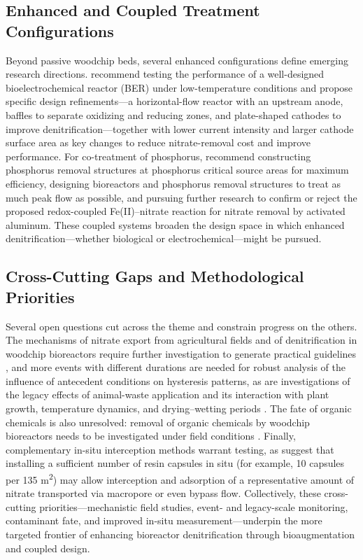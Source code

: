 \subsection{Enhanced and Coupled Treatment Configurations}
Beyond passive woodchip beds, several enhanced configurations define emerging research directions. \textcite{Law2018} recommend testing the performance of a well-designed bioelectrochemical reactor (BER) under low-temperature conditions and propose specific design refinements---a horizontal-flow reactor with an upstream anode, baffles to separate oxidizing and reducing zones, and plate-shaped cathodes to improve denitrification---together with lower current intensity and larger cathode surface area as key changes to reduce nitrate-removal cost and improve performance. For co-treatment of phosphorus, \textcite{Penn2024} recommend constructing phosphorus removal structures at phosphorus critical source areas for maximum efficiency, designing bioreactors and phosphorus removal structures to treat as much peak flow as possible, and pursuing further research to confirm or reject the proposed redox-coupled Fe(II)--nitrate reaction for nitrate removal by activated aluminum. These coupled systems broaden the design space in which enhanced denitrification---whether biological or electrochemical---might be pursued.

\subsection{Cross-Cutting Gaps and Methodological Priorities}
Several open questions cut across the theme and constrain progress on the others. The mechanisms of nitrate export from agricultural fields and of denitrification in woodchip bioreactors require further investigation to generate practical guidelines \parencite{Liu2020}, and more events with different durations are needed for robust analysis of the influence of antecedent conditions on hysteresis patterns, as are investigations of the legacy effects of animal-waste application and its interaction with plant growth, temperature dynamics, and drying--wetting periods \parencite{Liu2020}. The fate of organic chemicals is also unresolved: removal of organic chemicals by woodchip bioreactors needs to be investigated under field conditions \parencite{Ilhan2011}. Finally, complementary in-situ interception methods warrant testing, as \textcite{Pampolino2000} suggest that installing a sufficient number of resin capsules in situ (for example, 10 capsules per 135 m\textsuperscript{2}) may allow interception and adsorption of a representative amount of nitrate transported via macropore or even bypass flow. Collectively, these cross-cutting priorities---mechanistic field studies, event- and legacy-scale monitoring, contaminant fate, and improved in-situ measurement---underpin the more targeted frontier of enhancing bioreactor denitrification through bioaugmentation and coupled design.